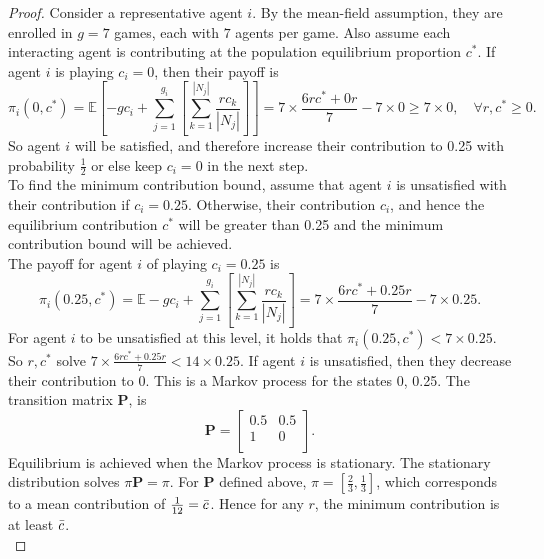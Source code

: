 \begin{proof}
Consider a representative agent $i$. By the mean-field assumption, they are enrolled in $g=7$ games, each with $7$ agents per game. Also assume each interacting agent is contributing at the population equilibrium proportion $c^*$. If agent $i$ is playing $c_i = 0$, then their payoff is \\
\begin{equation}
    \pi_i(0, c^*)= \mathbb E \left[ - gc_i + \sum_{j=1}^{g_i} [\sum_{k=1}^{|N_j|} \frac{rc_k}{|N_j|}] \right] =   7\times\frac{6rc^* + 0r}{7}-7\times0 \geq 7\times0, \quad \forall r, c^* \geq 0.
\end{equation}
So agent $i$ will be satisfied, and therefore increase their contribution to 0.25 with probability $\tfrac{1}{2}$ or else keep $c_i = 0$ in the next step. \\

To find the minimum contribution bound, assume that agent $i$ is unsatisfied with their contribution if $c_i = 0.25$. Otherwise, their contribution $c_i$, and hence the equilibrium contribution $c^*$ will be greater than 0.25 and the minimum contribution bound will be achieved. \\

The payoff for agent $i$ of playing $c_i=0.25$ is  \\
\begin{equation} \label{unsat}
    \pi_i(0.25, c^*)= \mathbb E - gc_i + \sum_{j=1}^{g_i} [\sum_{k=1}^{|N_j|} \frac{rc_k}{|N_j|}]  =   7\times\frac{6rc^* + 0.25r}{7}-7\times0.25. 
\end{equation}
For agent $i$ to be unsatisfied at this level, it holds that $\pi_i(0.25, c^*) <7\times 0.25$. So $r,c^*$ solve $7\times\frac{6rc^* + 0.25r}{7}<14\times0.25$. If agent $i$ is unsatisfied, then they decrease their contribution to 0. This is a Markov process for the states 0, 0.25. The transition matrix $\mathbf{P}$, is $$\mathbf P = \begin{bmatrix} 0.5& 0.5 \\
1& 0 \\
\end{bmatrix}. $$  Equilibrium is achieved when the Markov process is stationary. The stationary distribution solves $\pi \mathbf{P} = \pi$. For $\mathbf{P}$ defined above, $\pi = [\tfrac{2}{3}, \tfrac{1}{3}]$, which corresponds to a mean contribution of $\tfrac{1}{12} =\Bar{c}$. Hence for any $r$, the minimum contribution is at least $\Bar{c}$. \\
\end{proof}

